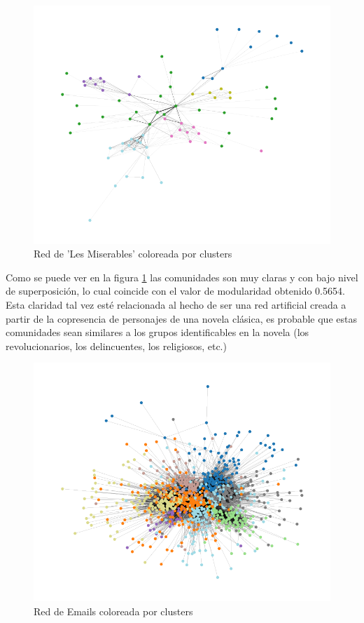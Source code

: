 \documentclass[conference]{IEEEtran}
\begin{document}
\begin{figure}[h]
    \centering
    \includegraphics[width=\linewidth]{img/lesmisLouvainGraph.png}
    \caption{Red de 'Les Miserables' coloreada por clusters}
    \label{fig:lesmis_louvain}
\end{figure}

Como se puede ver en la figura \ref{fig:lesmis_louvain} las comunidades son muy claras y con bajo nivel de superposición, lo cual coincide con el valor de modularidad obtenido 0.5654. Esta claridad tal vez esté relacionada al hecho de ser una red artificial creada a partir de la copresencia de personajes de una novela clásica, es probable que estas comunidades sean similares a los grupos identificables en la novela (los revolucionarios, los delincuentes, los religiosos, etc.) 

\begin{figure}[h]
    \centering
    \includegraphics[width=\linewidth]{img/emailLouvainGraph.png}
    \caption{Red de Emails coloreada por clusters}
    \label{fig:emails_louvain}
\end{figure}
\end{document}
